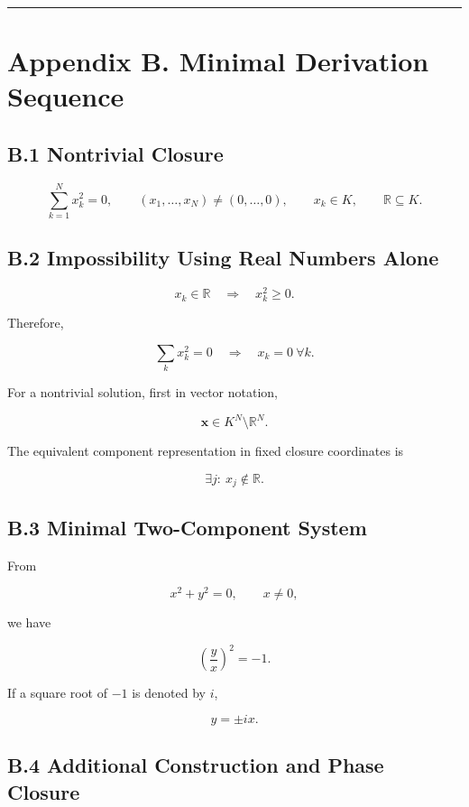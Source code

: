 \documentclass[
  a4paper,
  10pt]{article}
\begin{document}
\begin{center}\rule{0.5\linewidth}{0.5pt}\end{center}

\section{Appendix B. Minimal Derivation
Sequence}\label{appendix-b-minimal-derivation-sequence}

\subsection{B.1 Nontrivial Closure}\label{b1-nontrivial-closure}

\[
\sum_{k=1}^{N}x_k^2=0,
\qquad
(x_1,\ldots,x_N)\neq(0,\ldots,0),
\qquad
x_k\in K,
\qquad
\mathbb R\subseteq K.
\]

\subsection{B.2 Impossibility Using Real Numbers
Alone}\label{b2-impossibility-using-real-numbers-alone}

\[
x_k\in\mathbb R
\quad\Longrightarrow\quad
x_k^2\ge0.
\]

Therefore,

\[
\sum_kx_k^2=0
\quad\Longrightarrow\quad
x_k=0\ \forall k.
\]

For a nontrivial solution, first in vector notation,

\[
\mathbf{x}\in K^N\setminus\mathbb R^N.
\]

The equivalent component representation in fixed closure coordinates is

\[
\exists j:\ x_j\notin\mathbb R.
\]

\subsection{B.3 Minimal Two-Component
System}\label{b3-minimal-two-component-system}

From

\[
x^2+y^2=0,
\qquad x\neq0,
\]

we have

\[
\left(\frac{y}{x}\right)^2=-1.
\]

If a square root of \(-1\) is denoted by \(i\),

\[
y=\pm ix.
\]

\subsection{B.4 Additional Construction and Phase
Closure}\label{b4-additional-construction-and-phase-closure}
\end{document}
